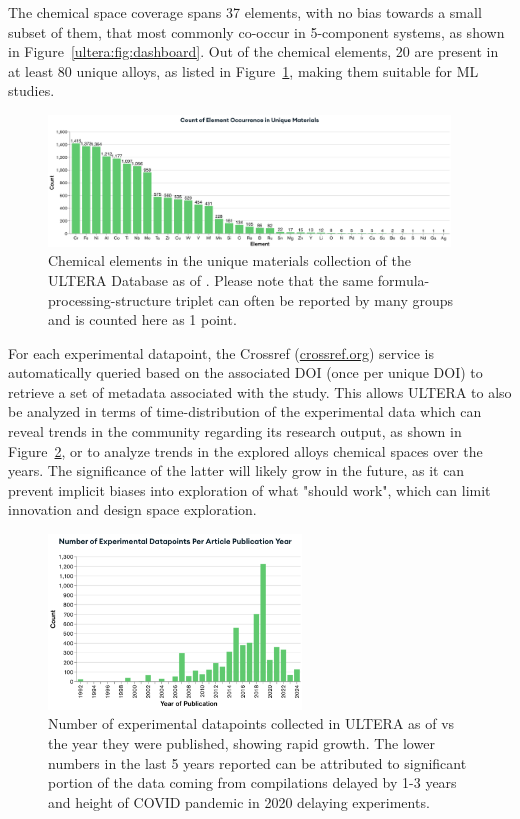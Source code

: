 The chemical space coverage spans 37 elements, with no bias towards a small subset of them, that most commonly co-occur in 5-component systems, as shown in Figure~\ref{ultera:fig:dashboard}. Out of the chemical elements, 20 are present in at least 80 unique alloys, as listed in Figure~\ref{ultera:fig:chemistries}, making them suitable for ML studies.

\begin{figure}[H]
    \centering
    \includegraphics[width=0.95\textwidth]{ultera/ultera_Chemistries.png}
    \caption{Chemical elements in the unique materials collection of the ULTERA Database as of \statisticstime. Please note that the same formula-processing-structure triplet can often be reported by many groups and is counted here as 1 point.}
    \label{ultera:fig:chemistries}
\end{figure}

For each experimental datapoint, the Crossref (\href{https://www.crossref.org}{crossref.org}) service is automatically queried based on the associated DOI (once per unique DOI) to retrieve a set of metadata associated with the study. This allows ULTERA to also be analyzed in terms of time-distribution of the experimental data which can reveal trends in the community regarding its research output, as shown in Figure~\ref{ultera:fig:publicationyears}, or to analyze trends in the explored alloys chemical spaces over the years. The significance of the latter will likely grow in the future, as it can prevent implicit biases into exploration of what "should work", which can limit innovation and design space exploration.

\begin{figure}[H]
    \centering
    \includegraphics[width=0.6\textwidth]{ultera/ultera_PublicationYear.png}
    \caption{Number of experimental datapoints collected in ULTERA as of \statisticstime vs the year they were published, showing rapid growth. The lower numbers in the last 5 years reported can be attributed to significant portion of the data coming from compilations delayed by 1-3 years and height of COVID pandemic in 2020 delaying experiments.}
    \label{ultera:fig:publicationyears}
\end{figure}

